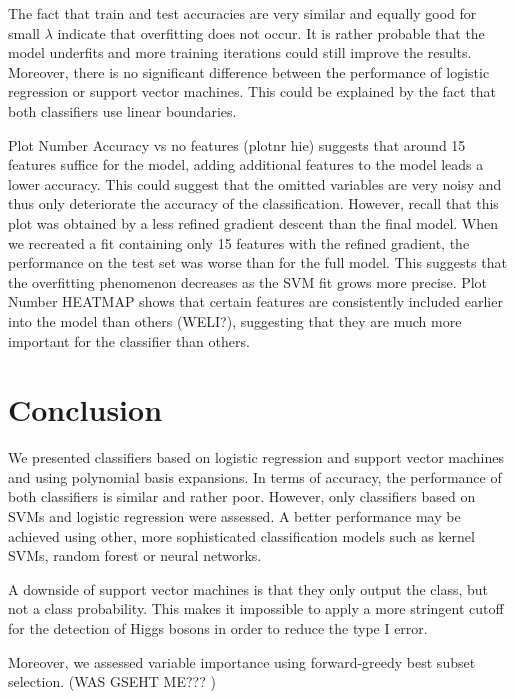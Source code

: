 \documentclass[10pt,conference,compsocconf]{IEEEtran}
\begin{document}
The fact that train and test accuracies are very similar and equally good for small $\lambda$ indicate that overfitting does not occur. It is rather probable that the model underfits and more training iterations could still improve the results. Moreover, there is no significant difference between the performance of logistic regression or support vector machines. This could be explained by the fact that both classifiers use linear boundaries.
\par
Plot Number Accuracy vs no features (plotnr hie) suggests that around 15 features suffice for the model, adding additional features to the model leads a lower accuracy. This could suggest that the omitted variables are very noisy and thus only deteriorate the accuracy of the classification.
However, recall that this plot was obtained by a less refined gradient descent than the final model. When we recreated a fit containing only 15 features with the refined gradient, the performance on the test set was worse than for the full model. This suggests that the overfitting phenomenon decreases as the SVM fit grows more precise.
Plot Number HEATMAP shows that certain features are consistently included earlier into the model than others (WELI?), suggesting that they are much more important for the classifier than others. 
\section*{Conclusion}
We presented classifiers based on logistic regression and support vector machines and using polynomial basis expansions. In terms of accuracy, the performance of both classifiers is similar and rather poor. However, only classifiers based on SVMs and logistic regression were assessed. A better performance may be achieved using other, more sophisticated classification models such as kernel SVMs, random forest or neural networks. 
\par
A downside of support vector machines is that they only output the class, but not a class probability. This makes it impossible to apply a more stringent cutoff for the detection of Higgs bosons in order to reduce the type I error. 
\par
Moreover, we assessed variable importance using forward-greedy best subset selection. (WAS GSEHT ME??? ) 


\end{document}
